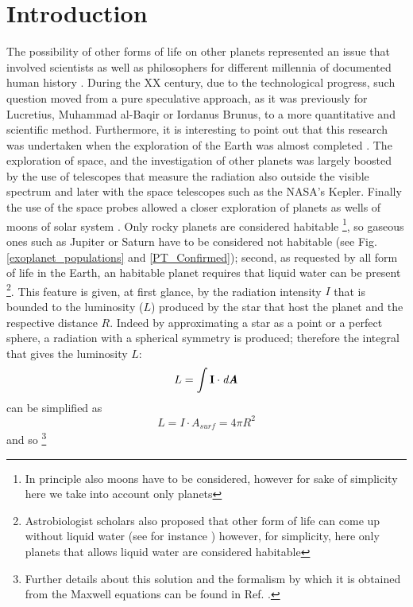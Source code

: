 \documentclass[
12pt, %
a4paper, %
oneside, %
headinclude,footinclude, %
BCOR5mm, %
]{scrartcl}
\begin{document}
\section{Introduction}
The possibility of other forms of life on other planets represented an issue that involved scientists as well as philosophers for different millennia of documented human history \cite{papagiannis1985historical}. During the XX century, due to the technological progress, such question moved from a pure speculative approach, as it was previously for Lucretius, Muhammad al-Baqir or Iordanus Brunus, to a more quantitative and scientific method. Furthermore, it is interesting to point out that this research was undertaken when the exploration of the Earth was almost completed \cite{fleming2001barrow}. The exploration of space, and the investigation of other planets was largely boosted by the use of telescopes that measure the radiation also outside the visible spectrum and later with the space telescopes such as the NASA's Kepler. Finally the use of the space probes allowed a closer exploration of planets as wells of moons of solar system \cite{space_probes}. 
Only rocky planets are considered habitable \footnote{In principle also moons have to be considered, however for sake of simplicity here we take into account only planets}, so gaseous ones such as Jupiter or Saturn have to be considered not habitable (see Fig. \ref{exoplanet_populations} and \ref{PT_Confirmed}); second, as requested by all form of life in the Earth, an habitable planet requires that liquid water can be present \cite{seager2013exoplanet,mckay2014requirements,rothschild2001life} \footnote{Astrobiologist scholars also proposed that other form of life can come up without liquid water (see for instance \cite{rahm2016polymorphism}) however, for simplicity, here only planets that allows liquid water are considered habitable}. This feature is given, at first glance, by the radiation intensity $I$ that is bounded to the luminosity ($L$) produced by the star that host the planet and the respective distance $R$. Indeed by approximating a star as a point or a perfect sphere, a radiation with a spherical symmetry is produced; therefore the integral that gives the luminosity $L$: 
\begin{equation}
L=\int \textbf{I}\cdot \textit{d\textbf{A}}
\end{equation}
can be simplified as 
\begin{equation}
L= I \cdot A_{surf}=4\pi R^{2}
\end{equation}
and so  \footnote{Further details about this solution and the formalism by which it is obtained from the Maxwell equations can be found in Ref. \cite{feynman}.}
\end{document}
